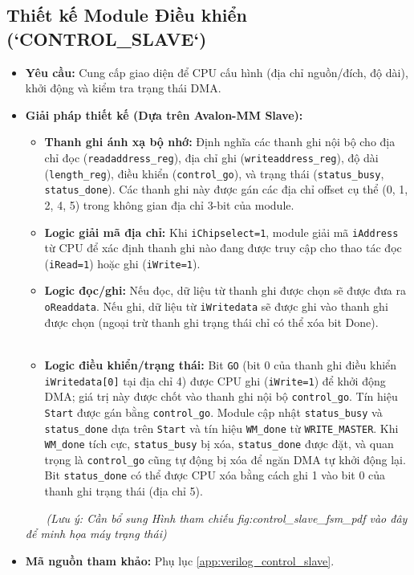 \subsection{Thiết kế Module Điều khiển (`CONTROL\_SLAVE`)}
\begin{itemize}
    \item \textbf{Yêu cầu:} Cung cấp giao diện để CPU cấu hình (địa chỉ nguồn/đích, độ dài), khởi động và kiểm tra trạng thái DMA.
    \item \textbf{Giải pháp thiết kế (Dựa trên Avalon-MM Slave):}
        \begin{itemize}
            \item \textbf{Thanh ghi ánh xạ bộ nhớ:} Định nghĩa các thanh ghi nội bộ cho địa chỉ đọc (\texttt{readaddress\_reg}), địa chỉ ghi (\texttt{writeaddress\_reg}), độ dài (\texttt{length\_reg}), điều khiển (\texttt{control\_go}), và trạng thái (\texttt{status\_busy}, \texttt{status\_done}). Các thanh ghi này được gán các địa chỉ offset cụ thể (0, 1, 2, 4, 5) trong không gian địa chỉ 3-bit của module.
            \item \textbf{Logic giải mã địa chỉ:} Khi \texttt{iChipselect=1}, module giải mã \texttt{iAddress} từ CPU để xác định thanh ghi nào đang được truy cập cho thao tác đọc (\texttt{iRead=1}) hoặc ghi (\texttt{iWrite=1}).
            \item \textbf{Logic đọc/ghi:} Nếu đọc, dữ liệu từ thanh ghi được chọn sẽ được đưa ra \texttt{oReaddata}. Nếu ghi, dữ liệu từ \texttt{iWritedata} sẽ được ghi vào thanh ghi được chọn (ngoại trừ thanh ghi trạng thái chỉ có thể xóa bit Done).
            \item \textbf{Logic điều khiển/trạng thái:} Bit \texttt{GO} (bit 0 của thanh ghi điều khiển \texttt{iWritedata[0]} tại địa chỉ 4) được CPU ghi (\texttt{iWrite=1}) để khởi động DMA; giá trị này được chốt vào thanh ghi nội bộ \texttt{control\_go}. Tín hiệu \texttt{Start} được gán bằng \texttt{control\_go}. Module cập nhật \texttt{status\_busy} và \texttt{status\_done} dựa trên \texttt{Start} và tín hiệu \texttt{WM\_done} từ \texttt{WRITE\_MASTER}. Khi \texttt{WM\_done} tích cực, \texttt{status\_busy} bị xóa, \texttt{status\_done} được đặt, và quan trọng là \texttt{control\_go} cũng tự động bị xóa để ngăn DMA tự khởi động lại. Bit \texttt{status\_done} có thể được CPU xóa bằng cách ghi 1 vào bit 0 của thanh ghi trạng thái (địa chỉ 5).
        \end{itemize}
\textit{(Lưu ý: Cần bổ sung Hình tham chiếu fig:control\_slave\_fsm\_pdf vào đây để minh họa máy trạng thái)}
    \item \textbf{Mã nguồn tham khảo:} Phụ lục \ref{app:verilog_control_slave}.
\end{itemize}

